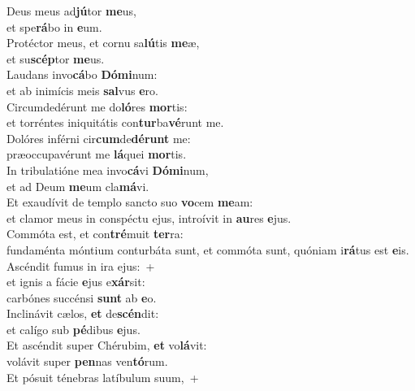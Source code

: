 \evenverse Deus meus ad\textbf{jú}tor \textbf{me}us,~\*\\
\evenverse et spe\textbf{rá}bo in \textbf{e}um.\\
\oddverse Protéctor meus, et cornu sa\textbf{lú}tis \textbf{me}æ,~\*\\
\oddverse et su\textbf{scép}tor \textbf{me}us.\\
\evenverse Laudans invo\textbf{cá}bo \textbf{Dó}\textbf{mi}num:~\*\\
\evenverse et ab inimícis meis \textbf{sal}vus \textbf{e}ro.\\
\oddverse Circumdedérunt me do\textbf{ló}res \textbf{mor}tis:~\*\\
\oddverse et torréntes iniquitátis con\textbf{tur}ba\textbf{vé}runt me.\\
\evenverse Dolóres inférni cir\textbf{cum}de\textbf{dé}\textbf{runt} me:~\*\\
\evenverse præoccupavérunt me \textbf{lá}quei \textbf{mor}tis.\\
\oddverse In tribulatióne mea invo\textbf{cá}vi \textbf{Dó}\textbf{mi}num,~\*\\
\oddverse et ad Deum \textbf{me}um cla\textbf{má}vi.\\
\evenverse Et exaudívit de templo sancto suo \textbf{vo}cem \textbf{me}am:~\*\\
\evenverse et clamor meus in conspéctu ejus, introívit in \textbf{au}res \textbf{e}jus.\\
\oddverse Commóta est, et con\textbf{tré}muit \textbf{ter}ra:~\*\\
\oddverse fundaménta móntium conturbáta sunt, et commóta sunt, quóniam i\textbf{rá}tus est \textbf{e}is.\\
\evenverse Ascéndit fumus in ira ejus:~+\\
\evenverse  et ignis a fácie \textbf{e}jus e\textbf{xár}sit:~\*\\
\evenverse carbónes succénsi \textbf{sunt} ab \textbf{e}o.\\
\oddverse Inclinávit cælos, \textbf{et} de\textbf{scén}dit:~\*\\
\oddverse et calígo sub \textbf{pé}dibus \textbf{e}jus.\\
\evenverse Et ascéndit super Chérubim, \textbf{et} vo\textbf{lá}vit:~\*\\
\evenverse volávit super \textbf{pen}nas ven\textbf{tó}rum.\\
\oddverse Et pósuit ténebras latíbulum suum,~+\\
